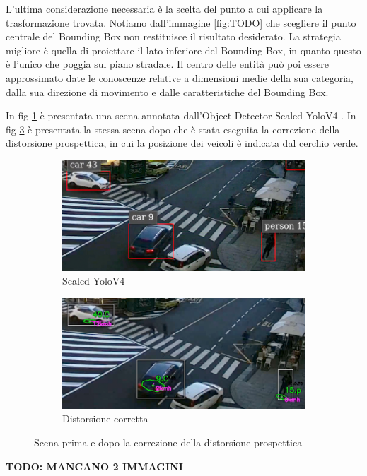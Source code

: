 L'ultima considerazione necessaria è la scelta del punto a cui applicare la trasformazione trovata.
Notiamo dall'immagine \ref{fig:TODO} che scegliere il punto centrale del Bounding Box non restituisce il risultato desiderato.
La strategia migliore è quella di proiettare il lato inferiore del Bounding Box, in quanto questo è l'unico che poggia sul piano stradale.
Il centro delle entità può poi essere approssimato date le conoscenze relative a dimensioni medie della sua categoria, dalla sua direzione di movimento e dalle caratteristiche del Bounding Box.

In fig \ref{fig:perspyolo} è presentata una scena annotata dall'Object Detector Scaled-YoloV4 \cite{yolocsp}.
In fig \ref{fig:perspcorrect} è presentata la stessa scena dopo che è stata eseguita la correzione della distorsione prospettica, in cui la posizione dei veicoli è indicata dal cerchio verde.

\begin{figure}
    \centering
    \begin{subfigure}{.49\textwidth}
        \includegraphics[width=\textwidth]{images/yolo.png}
        \caption{Scaled-YoloV4}
        \label{fig:perspyolo}
    \end{subfigure}
    \hfill
    \begin{subfigure}{.49\textwidth}
        \includegraphics[width=\textwidth]{images/corrected.png}
        \caption{Distorsione corretta}
        \label{fig:perspcorrect}
    \end{subfigure}
    \caption{Scena prima e dopo la correzione della distorsione prospettica}
\end{figure}

\textbf{TODO: MANCANO 2 IMMAGINI}

